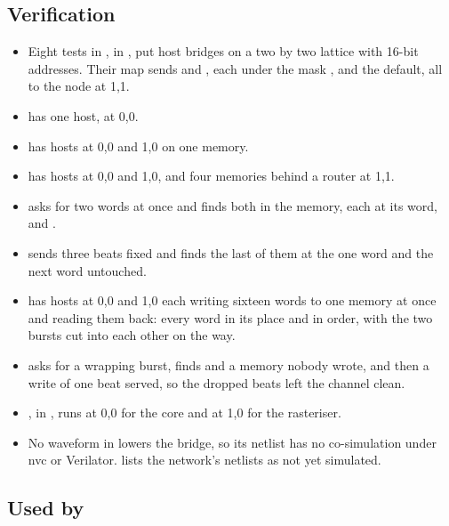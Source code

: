 \subsection*{Verification}

\begin{itemize}
\item Eight tests in , in
, put host bridges on a two by two
lattice with 16-bit addresses. Their map sends  and
, each under the mask , and the default, all
to the node at 1,1.
\item {}
has one host, at 0,0.
\item {}
has hosts at 0,0 and 1,0 on one memory.
\item {} has hosts at 0,0 and
1,0, and four memories behind a router at 1,1.
\item {}
asks for two words at once and finds both in the memory, each at its
word, and .
\item {} sends
three beats fixed and finds the last of them at the one word and the
next word untouched.
\item {}
has hosts at 0,0 and 1,0 each writing sixteen words to one memory
at once and reading them back: every word in its place and in order,
with the two bursts cut into each other on the way.
\item {}
asks for a wrapping burst, finds  and a memory nobody
wrote, and then a write of one beat served, so the dropped beats left
the channel clean.
\item {}, in
, runs  at 0,0 for the core
and at 1,0 for the rasteriser.
\item No waveform in  lowers the bridge, so its
netlist has no co-simulation under nvc or Verilator.
 lists the network's netlists as not yet
simulated.
\end{itemize}

\subsection*{Used by}

